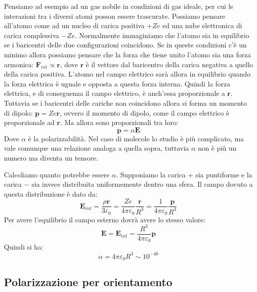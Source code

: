 \documentclass{article}
\renewcommand{\epsilon}{\varepsilon}
\newcommand{\ez}{\epsilon_0}
\newcommand{\mbf}{\mathbf}
\newcommand{\qpe}[1][1]{ \frac{ #1 }{ 4\pi\epsilon_0 } }
\numberwithin{equation}{section}
\begin{document}
Pensiamo ad esempio ad un gas nobile in condizioni di gas ideale, per cui le interazioni tra i diversi atomi posson essere trascurate. Possiamo pensare all'atomo come ad un nucleo di carica positiva $+Ze$ ed una nube elettronica di carica complessiva $-Ze$. Normalmente immaginiamo che l'atomo sia in equilibrio se i baricentri delle due configurazioni coincidono. Se in queste condizioni c'è un minimo allora possiamo pensare che la forza che tiene unito l'atomo sia una forza armonica: $\mbf F_{int} \propto \mbf r $, dove $\mbf r$ è il vettore dal baricentro della carica negativa a quello della carica positiva. L'atomo nel campo elettrico sarà allora in equilibrio quando la forza elettrica è uguale e opposta a questa forza interna. Quindi la forza elettrica, e di conseguenza il campo elettrico, è anch'essa proporzionale a $\mbf r$. Tuttavia se i baricentri delle cariche non coincidono allora si forma un momento di dipolo: $\mbf p = Ze \mbf r$, ovvero il momento di dipolo, come il campo elettrico è proporzionale ad $\mbf r$. Ma allora sono proporzionali tra loro:
\begin{equation}
    \mbf p = \alpha \mbf E
\end{equation}
Dove $\alpha$ è la polarizzabilità. Nel caso di molecole lo studio è più complicato, ma vale comunque una relazione analoga a quella sopra, tuttavia $\alpha$ non è più un numero ma diventa un tensore.

Calcoliamo quanto potrebbe essere $\alpha$. Supponiamo la carica + sia puntiforme e la carica $-$ sia invece distribuita uniformemente dentro una sfera. Il campo dovuto a questa distribuzione è dato da:
\begin{equation}
    \mbf E_{int} = \frac{ \rho \mbf r }{ 3 \ez } = \qpe[Ze] \frac{ \mbf r }{ R^3 } = \qpe \frac{ \mbf p }{ R^3 } 
\end{equation}
Per avere l'equilibrio il campo esterno dovrà avere lo stesso valore:
\begin{equation}
    \mbf E = \mbf E_{int} = \qpe[R^3] \mbf p
\end{equation}
Quindi si ha:
\begin{equation}
    \alpha = 4 \pi \ez R^3 \sim 10^{-40}
\end{equation}


\subsection{Polarizzazione per orientamento} %
\label{sub:polarizzazione_per_orientamento}
\end{document}

